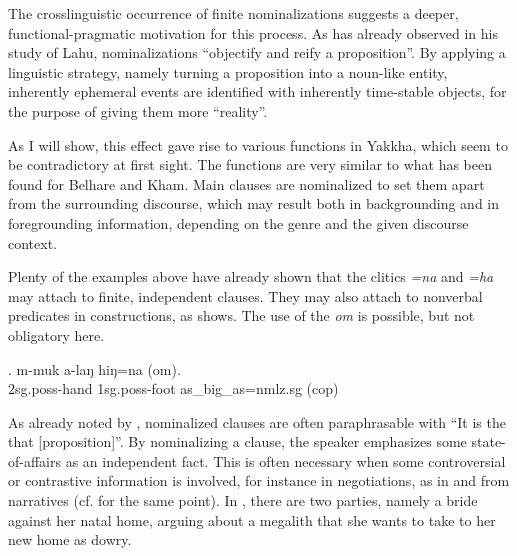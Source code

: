  The crosslinguistic occurrence of finite nominalizations suggests a deeper, func\-tional-prag\-matic motivation for this process. As \citet[246]{Matisoff1972Lahu} has already observed in his study of Lahu, nominalizations “objectify and reify a proposition”. By applying a linguistic strategy, namely turning a proposition into a noun-like entity, inherently ephemeral events are identified with inherently time-stable objects, for the purpose of giving them more “reality”. 
 
As I will show, this effect gave rise to various functions in Yakkha, which seem to be  contradictory at first sight. The functions are very similar to what has been found for Belhare and Kham. Main clauses are nominalized to set them apart from the surrounding discourse, which may result both in backgrounding and in foregrounding information, depending on the genre and the given discourse context.

 




Plenty of the examples above have already shown that the clitics \emph{=na} and \emph{=ha} may attach to finite, independent clauses.  They may also attach to nonverbal predicates in  constructions, as \Next shows. The use of the   \emph{om} is possible, but not obligatory here.
	
	\exg. m-muk a-laŋ hiŋ=na (om).\\
 {\sc 2sg.poss-}hand {\sc 1sg.poss-}foot 	as\_big\_as{\sc =nmlz.sg} ({\sc cop})	\\
	
	
As already noted by \citet{Matisoff1972Lahu}, nominalized clauses are often paraphrasable with  “It is the  that [proposition]”. By nominalizing a clause, the speaker emphasizes some state-of-affairs as an independent fact. This is often necessary when some controversial or contrastive information is involved, for instance in negotiations, as in \Next and \NNext from narratives (cf. \citet{Bickel1999Nominalization} for the same point). In \Next, there are two parties, namely a bride against her natal home, arguing about  a megalith that she wants to take to her new home as dowry. 

